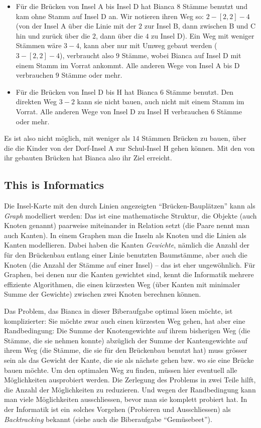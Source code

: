 \documentclass[a4paper,11pt]{report}
\begin{document}
\begin{itemize}
  \item Für die Brücken von Insel A bis Insel D hat Bianca $8$ Stämme benutzt und kam ohne Stamm auf Insel D an.  Wir notieren ihren Weg so: ${2-[2,2]-4}$ (von der Insel A über die Linie mit der $2$ zur Insel B, dann zwischen B und C hin und zurück über die $2$, dann über die $4$ zu Insel D).  Ein Weg mit weniger Stämmen wäre ${3-4}$, kann aber nur mit Umweg gebaut werden (${3-[2,2]-4}$), verbraucht also $9$ Stämme, wobei Bianca auf Insel D mit einem Stamm im Vorrat ankommt.  Alle anderen Wege von Insel A bis D verbrauchen $9$ Stämme oder mehr.
  \item Für die Brücken von Insel D bis H hat Bianca $6$ Stämme benutzt. Den direkten Weg ${3-2}$ kann sie nicht bauen, auch nicht mit einem Stamm im Vorrat. Alle anderen Wege von Insel D zu Insel H verbrauchen $6$ Stämme oder mehr.
\end{itemize}

Es ist also nicht möglich, mit weniger als $14$ Stämmen Brücken zu bauen, über die die Kinder von der Dorf-Insel A zur Schul-Insel H gehen können.  Mit den von ihr gebauten Brücken hat Bianca also ihr Ziel erreicht.


\subsection*{This is Informatics}

Die Insel-Karte mit den durch Linien angezeigten \enquote{Brücken-Bauplätzen} kann als \emph{Graph} modelliert werden:  Das ist eine mathematische Struktur, die Objekte (auch Knoten genannt) paarweise miteinander in Relation setzt (die Paare nennt man auch Kanten).  In einem Graphen man die Inseln als Knoten und die Linien als Kanten modellieren.  Dabei haben die Kanten \emph{Gewichte}, nämlich die Anzahl der für den Brückenbau entlang einer Linie benutzten Baumstämme, aber auch die Knoten (die Anzahl der Stämme auf einer Insel) – das ist eher ungewöhnlich.  Für Graphen, bei denen nur die Kanten gewichtet sind, kennt die Informatik mehrere effiziente Algorithmen, die einen kürzesten Weg (über Kanten mit minimaler Summe der Gewichte) zwischen zwei Knoten berechnen können.

Das Problem, das Bianca in dieser Biberaufgabe optimal lösen möchte, ist komplizierter:  Sie möchte zwar auch einen kürzesten Weg gehen, hat aber eine Randbedingung:  Die Summe der Knotengewichte auf ihrem bisherigen Weg (die Stämme, die sie nehmen konnte) abzüglich der Summe der Kantengewichte auf ihrem Weg (die Stämme, die sie für den Brückenbau benutzt hat) muss grösser sein als das Gewicht der Kante, die sie als nächste gehen bzw. wo sie eine Brücke bauen möchte.  Um den optimalen Weg zu finden, müssen hier eventuell alle Möglichkeiten ausprobiert werden.  Die Zerlegung des Problems in zwei Teile hilft, die Anzahl der Möglichkeiten zu reduzieren.  Und wegen der Randbedingung kann man viele Möglichkeiten ausschliessen, bevor man sie komplett probiert hat.  In der Informatik ist ein~solches Vorgehen (Probieren und Ausschliessen) als \emph{Backtracking} bekannt (siehe auch die Biberaufgabe \enquote{Gemüsebeet}).
\end{document}
